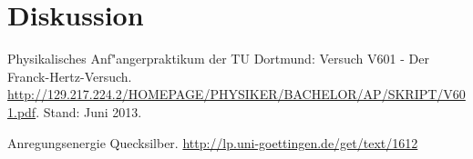 \section{Diskussion}
\label{sec:diskussion}

\begin{thebibliography}{9}
	 Physikalisches Anf"angerpraktikum der TU Dortmund: Versuch V601 - Der Franck-Hertz-Versuch. \url{http://129.217.224.2/HOMEPAGE/PHYSIKER/BACHELOR/AP/SKRIPT/V601.pdf}. Stand: Juni 2013.

	 Anregungsenergie Quecksilber. \url{http://lp.uni-goettingen.de/get/text/1612}
\end{thebibliography}
